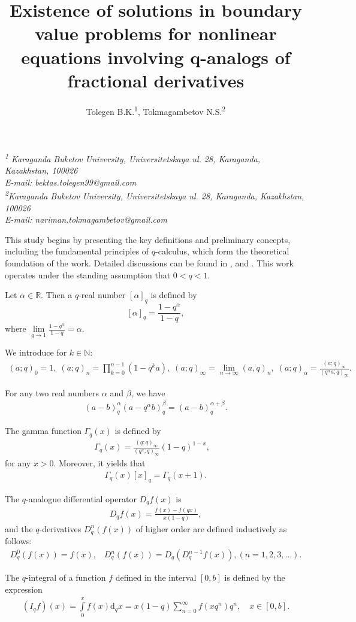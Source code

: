 \documentclass[12pt]{article}
\title{Existence of solutions in boundary value problems for nonlinear equations involving q-analogs of fractional derivatives}
\author{Tolegen B.K.\textsuperscript{1}, Tokmagambetov N.S.\textsuperscript{2}}
\date{}
\makeatletter
\renewcommand{\maketitle}{%
    \begin{center}
        \Large\@title

        \vspace{0.4cm}
        \large\@author

        \vspace{0.5cm}
        \normalsize\textit{\textsuperscript{1} Karaganda Buketov University, Universitetskaya ul. 28, Karaganda, Kazakhstan, 100026\\
          E-mail: bektas.tolegen99@gmail.com\\
          \textsuperscript{2}Karaganda Buketov University, Universitetskaya ul. 28, Karaganda, Kazakhstan, 100026\\
          E-mail: nariman.tokmagambetov@gmail.com\\}
    \end{center}
}
\makeatother
\begin{document}
\maketitle

This study begins by presenting the key definitions and preliminary concepts, including the fundamental principles of $q$-calculus, which form the theoretical foundation of the work. Detailed discussions can be found in \cite{CK2000}, \cite{E2002} and \cite{A1969}. This work operates under the standing assumption that
$0<q<1$.

Let $\alpha \in \mathbb{R}$. Then a $q$-real number $[\alpha ]_q$ is defined by
$$
[\alpha ]_{q}=\frac{1-q^{\alpha }}{1-q},
$$
where $\mathop{\lim }\limits_{q\rightarrow 1}\frac{1-q^{\alpha }}{1-q}%
=\alpha $.


We introduce for $k\in\mathbb{N}$:
\begin{eqnarray*}
(a;q)_0=1,  \; (a;q)_n=\prod\limits_{k=0}^{n-1}\left(1-q^ka\right),  \; (a; q)_\infty = \lim\limits_{n\rightarrow\infty}(a,q)_n, \;
(a;q)_\alpha=\frac{(a;q)_\infty}{(q^\alpha a;q)_\infty}.
\end{eqnarray*}



For any two real numbers $\alpha$ and $\beta$, we have
\begin{eqnarray*}
\left(a-b\right)^\alpha_q\left(a-q^\alpha{b}\right)^\beta_q=\left(a-b\right)^{\alpha+\beta}_q.
\end{eqnarray*}

The gamma function $\Gamma_q(x)$ is defined by
\begin{eqnarray*}
\Gamma_q(x)=\frac{(q; q)_\infty }{(q^x; q)_\infty }(1-q)^{1-x}, \;\;\;
\end{eqnarray*}
for any $x > 0$. Moreover, it yields that
\begin{eqnarray*}
\Gamma_q(x)[x]_q=\Gamma_q(x+1).
\end{eqnarray*}

The $q$-analogue differential operator $D_{q}f(x)$ is
\begin{eqnarray*}
D_{q}f(x)=\frac{f(x)-f(qx)}{x(1-q)},
\end{eqnarray*}
and the $q$-derivatives $D^{n}_q(f(x))$ of higher order are defined inductively as follows:
\begin{eqnarray*}
D_q^0(f(x))=f(x), \;\;\; D^{n}_q(f(x))=D_q\left(D_q^{n-1}f(x)\right), (n=1,2,3, \dots).
\end{eqnarray*}

The $q$-integral of a function $f$ defined in the interval $[0,b]$ is defined by the expression
\begin{eqnarray*}
\left(I_q f\right)(x)=\int\limits_0^x f(x) \mathrm{d}_q x=x(1-q) \sum_{n=0}^{\infty} f\left(x q^n\right) q^n, \quad x \in[0, b].
\end{eqnarray*}
\end{document}
